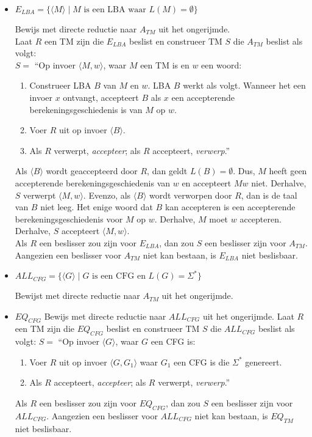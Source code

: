 \documentclass[]{article}
\begin{document}
\begin{itemize}
	
	\item $E_{LBA} = \{ \langle M \rangle \mid M \mbox{ is een LBA waar } L(M) = \emptyset \}$
	
	Bewijs met directe reductie naar $A_{TM}$ uit het ongerijmde. \\
	Laat $R$ een TM zijn die $E_{LBA}$ beslist en construeer TM $S$ die $A_{TM}$ beslist als volgt: \\	
	$S = $ ``Op invoer $\langle M, w \rangle$, waar $M$ een TM is en $w$ een woord:
	\begin{enumerate}
		\item Construeer LBA $B$ van $M$ en $w$. LBA $B$ werkt als volgt. Wanneer het een invoer $x$ ontvangt, accepteert $B$ als $x$ een accepterende berekeningsgeschiedenis is van $M$ op $w$.
		\item Voer $R$ uit op invoer $\langle B \rangle$.
		\item Als $R$ verwerpt, \emph{accepteer}; als $R$ accepteert, \emph{verwerp}.''
	\end{enumerate}
	Als $\langle B \rangle$ wordt geaccepteerd door $R$, dan geldt $L(B) = \emptyset$. Dus, $M$ heeft geen accepterende berekeningsgeschiedenis van $w$ en accepteert $M w$ niet. Derhalve, $S$ verwerpt $\langle M, w \rangle$. Evenzo, als $\langle B \rangle$ wordt verworpen door $R$, dan is de taal van $B$ niet leeg. Het enige woord dat $B$ kan accepteren is een accepterende berekeningsgeschiedenis voor $M$ op $w$. Derhalve, $M$ moet $w$ accepteren. Derhalve, $S$ accepteert $\langle M, w \rangle$. \\
	Als $R$ een beslisser zou zijn voor $E_{LBA}$, dan zou $S$ een beslisser zijn voor $A_{TM}$. Aangezien een beslisser voor $A_{TM}$ niet kan bestaan, is $E_{LBA}$ niet beslisbaar.
	
	
	\item $ALL_{CFG} = \{ \langle G \rangle \mid G \mbox{ is een CFG en } L(G) = \Sigma^* \}$
	
	Bewijst met directe reductie naar $A_{TM}$ uit het ongerijmde.
	
	
	\item $EQ_{CFG}$
	Bewijs met directe reductie naar $ALL_{CFG}$ uit het ongerijmde.
	Laat $R$ een TM zijn die $EQ_{CFG}$ beslist en construeer TM $S$ die $ALL_{CFG}$ beslist als volgt:
	$S = $ ``Op invoer $\langle G \rangle$, waar $G$ een CFG is:
	\begin{enumerate}
		\item Voer $R$ uit op invoer $\langle G, G_1 \rangle$ waar $G_1$ een CFG is die $\Sigma^*$ genereert.
		\item Als $R$ accepteert, \emph{accepteer}; als $R$ verwerpt, \emph{verwerp}.''
	\end{enumerate}
	Als $R$ een beslisser zou zijn voor $EQ_{CFG}$, dan zou $S$ een beslisser zijn voor $ALL_{CFG}$. Aangezien een beslisser voor $ALL_{CFG}$ niet kan bestaan, is $EQ_{TM}$ niet beslisbaar.
	

\end{itemize}
\end{document}
